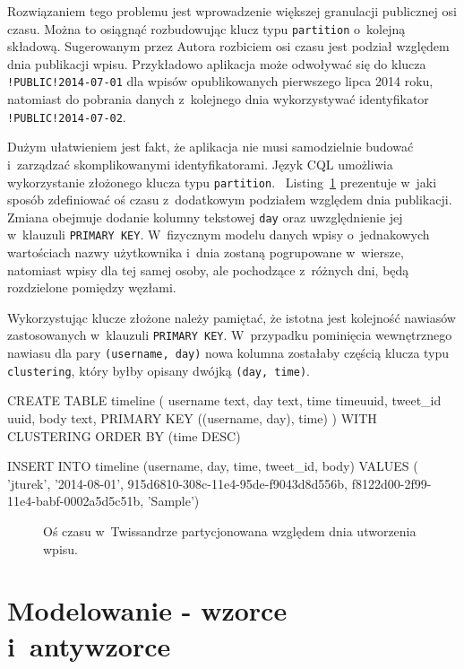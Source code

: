 Rozwiązaniem tego problemu jest wprowadzenie większej granulacji publicznej osi czasu. Można to osiągnąć rozbudowując klucz typu \verb+partition+ o~kolejną składową. Sugerowanym przez Autora rozbiciem osi czasu jest podział względem dnia publikacji wpisu. Przykładowo aplikacja może odwoływać się do klucza \verb+!PUBLIC!2014-07-01+ dla wpisów opublikowanych pierwszego lipca 2014 roku, natomiast do pobrania danych z~kolejnego dnia wykorzystywać identyfikator \verb+!PUBLIC!2014-07-02+. 

Dużym ułatwieniem jest fakt, że aplikacja nie musi samodzielnie budować i~zarządzać skomplikowanymi identyfikatorami. Język CQL umożliwia wykorzystanie złożonego klucza typu \verb+partition+.~\cite{create_table_cassandra_reference} Listing~\ref{lst:timeline_day_partitioned} prezentuje w~jaki sposób zdefiniować oś czasu z~dodatkowym podziałem względem dnia publikacji. Zmiana obejmuje dodanie kolumny tekstowej \verb+day+ oraz uwzględnienie jej w~klauzuli \verb+PRIMARY KEY+. W~fizycznym modelu danych wpisy o~jednakowych wartościach nazwy użytkownika i~dnia zostaną pogrupowane w~wiersze, natomiast wpisy dla tej samej osoby, ale pochodzące z~różnych dni, będą rozdzielone pomiędzy węzłami.

Wykorzystując klucze złożone należy pamiętać, że istotna jest kolejność nawiasów zastosowanych w~klauzuli \verb+PRIMARY KEY+. W~przypadku pominięcia wewnętrznego nawiasu dla pary \verb+(username, day)+ nowa kolumna zostałaby częścią klucza typu \verb+clustering+, który byłby opisany dwójką \verb+(day, time)+.

\begin{verbbox}
CREATE TABLE timeline (
    username text,
    day text,
    time timeuuid,
    tweet_id uuid,
    body text,
    PRIMARY KEY ((username, day), time)
) WITH CLUSTERING ORDER BY (time DESC)

INSERT INTO timeline (username, day, time, 
        tweet_id, body) VALUES (
    'jturek',
    '2014-08-01',
    915d6810-308c-11e4-95de-f9043d8d556b,
    f8122d00-2f99-11e4-babf-0002a5d5c51b,
    'Sample')
\end{verbbox}

\begin{figure}[ht!]
	\centering
	\theverbbox
	\caption{Oś czasu w~Twissandrze partycjonowana względem dnia utworzenia wpisu.}
	\label{lst:timeline_day_partitioned}
\end{figure}

\section{Modelowanie - wzorce i~antywzorce}
\label{sec:patterns_and_antipatterns}

